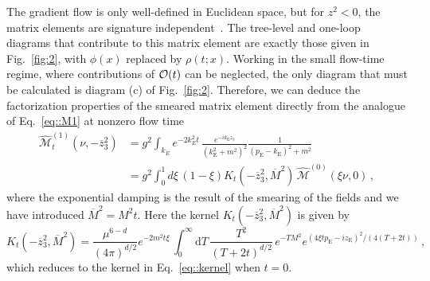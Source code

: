 The gradient flow is only well-defined in Euclidean space, but for $z^2 <0$, the
matrix elements are signature independent~\cite{Briceno:2017cpo}. The tree-level
and one-loop diagrams that contribute to this matrix element are exactly those
given in Fig.~\ref{fig:2}, with $\phi(x)$ replaced by $\rho(t;x)$. Working in
the small flow-time regime, where contributions of ${\cal O}(t)$ can be
neglected, the only diagram that must be calculated is diagram (c) of
Fig.~\ref{fig:2}. Therefore, we can deduce the factorization properties of the
smeared matrix element directly from the analogue of Eq.~\eqref{eq::M1} at
nonzero flow time
\begin{align}
   \label{eq::M1t}
   \widehat{\mathcal{M}}_t^{(1)}\left(\nu, -\overline{z}_3^2\right) 
   &= g^2 \int_{k_E}  e^{-2k_E^2t}\,
   \frac{e^{-i k_{\mathrm{E}}z_3}}
        {\left(k_{\mathrm{E}}^2+m^2\right)^2}
   \frac{1}{\left(p_{\mathrm{E}}-k_{\mathrm{E}}\right)^2+m^2} \nonumber \\
   &= g^2 \int_0^1 d\xi\,
        \left(1-\xi\right) K_t\left(-\overline{z}_3^2, \overline{M}^2\right)\, 
        \widehat{\mathcal{M}}^{(0)}\left(\xi\nu, 0\right)\, ,
\end{align}
where the exponential damping is the result of the smearing of the fields and we
have introduced $\overline{M}^2 = M^2 t$. Here the kernel
$K_t\left(-\overline{z}_3^2, \overline{M}^2\right)$ is given by
\begin{equation} 
        \label{eq:ktd}
        K_t\left(-\overline{z}_3^2, \overline{M}^2\right) =  
        \frac{\mu^{6-d}}{(4\pi)^{d/2}} e^{-2m^2t\xi}\, 
        \int_0^\infty \mathrm{d}T\,
                \frac{T^2}{(T+2t)^{d/2}}\, e^{-TM^2} 
                e^{(4\xi t p_{\mathrm{E}} - iz_{\mathrm{E}})^2/(4(T+2t))}\, ,
\end{equation}
which reduces to the kernel in Eq.~\eqref{eq::kernel} when $t = 0$.

